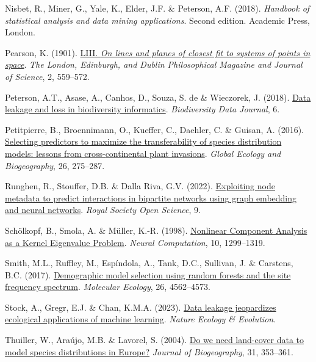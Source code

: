 \documentclass[
  letterpaper,
]{scrbook}
\newlength{\cslhangindent}
\newenvironment{CSLReferences}[2] %
 {\begin{list}{}{%
  \setlength{\itemindent}{0pt}
  \setlength{\leftmargin}{0pt}
  \setlength{\parsep}{0pt}
  \ifodd #1
   \setlength{\leftmargin}{\cslhangindent}
   \setlength{\itemindent}{-1\cslhangindent}
  \fi
  \setlength{\itemsep}{#2\baselineskip}}}
 {\end{list}}
\begin{document}
\begin{CSLReferences}{1}{0}
Nisbet, R., Miner, G., Yale, K., Elder, J.F. \& Peterson, A.F. (2018).
\emph{Handbook of statistical analysis and data mining applications}.
Second edition. Academic Press, London.

Pearson, K. (1901).
\href{https://doi.org/10.1080/14786440109462720}{LIII. {\emph{On lines
and planes of closest fit to systems of points in space}}}. \emph{The
London, Edinburgh, and Dublin Philosophical Magazine and Journal of
Science}, 2, 559--572.

Peterson, A.T., Asase, A., Canhos, D., Souza, S. de \& Wieczorek, J.
(2018). \href{https://doi.org/10.3897/bdj.6.e26826}{Data leakage and
loss in biodiversity informatics}. \emph{Biodiversity Data Journal}, 6.

Petitpierre, B., Broennimann, O., Kueffer, C., Daehler, C. \& Guisan, A.
(2016). \href{https://doi.org/10.1111/geb.12530}{Selecting predictors to
maximize the transferability of species distribution models: lessons
from cross{-}continental plant invasions}. \emph{Global Ecology and
Biogeography}, 26, 275--287.

Runghen, R., Stouffer, D.B. \& Dalla Riva, G.V. (2022).
\href{https://doi.org/10.1098/rsos.220079}{Exploiting node metadata to
predict interactions in bipartite networks using graph embedding and
neural networks}. \emph{Royal Society Open Science}, 9.

Schölkopf, B., Smola, A. \& Müller, K.-R. (1998).
\href{https://doi.org/10.1162/089976698300017467}{Nonlinear Component
Analysis as a Kernel Eigenvalue Problem}. \emph{Neural Computation}, 10,
1299--1319.

Smith, M.L., Ruffley, M., Espíndola, A., Tank, D.C., Sullivan, J. \&
Carstens, B.C. (2017).
\href{https://doi.org/10.1111/mec.14223}{Demographic model selection
using random forests and the site frequency spectrum}. \emph{Molecular
Ecology}, 26, 4562--4573.

Stock, A., Gregr, E.J. \& Chan, K.M.A. (2023).
\href{https://doi.org/10.1038/s41559-023-02162-1}{Data leakage
jeopardizes ecological applications of machine learning}. \emph{Nature
Ecology \& Evolution}.

Thuiller, W., Araújo, M.B. \& Lavorel, S. (2004).
\href{https://doi.org/10.1046/j.0305-0270.2003.00991.x}{Do we need
land{-}cover data to model species distributions in Europe?}
\emph{Journal of Biogeography}, 31, 353--361.


\end{CSLReferences}
\end{document}
